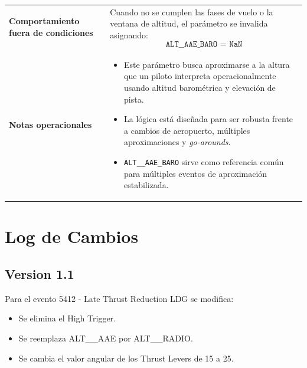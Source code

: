 \documentclass[11pt,a4paper]{article}
\begin{document}
\begin{longtable}{p{5cm} p{9.5cm}}
		\textbf{Comportamiento fuera de condiciones} &
		Cuando no se cumplen las fases de vuelo o la ventana de altitud, el parámetro se invalida asignando:
		\[
		\texttt{ALT\_\_AAE\_BARO = NaN}
		\]
		\\
		
		\textbf{Notas operacionales} &
		\begin{itemize}
			\item Este parámetro busca aproximarse a la altura que un piloto interpreta operacionalmente usando altitud barométrica y elevación de pista.
			\item La lógica está diseñada para ser robusta frente a cambios de aeropuerto, múltiples aproximaciones y \textit{go-arounds}.
			\item \texttt{ALT\_\_AAE\_BARO} sirve como referencia común para múltiples eventos de aproximación estabilizada.
		\end{itemize}
		\\ \hline
	\end{longtable}
	
	\section{Log de Cambios}
	\subsection{Version 1.1}
	Para el evento 5412 - Late Thrust Reduction LDG se modifica: 
	\begin{itemize}
		\item Se elimina el High Trigger.
		\item Se reemplaza ALT\_\_AAE por ALT\_\_RADIO.
		\item Se cambia el valor angular de los Thrust Levers de 15 a 25. 
	\end{itemize}
\end{document}
